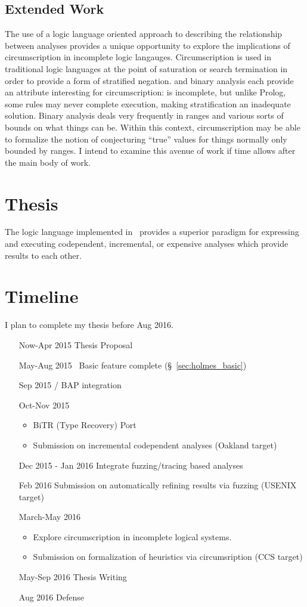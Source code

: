 \subsection{Extended Work}
The use of a logic language oriented approach to describing the relationship between analyses provides a unique opportunity to explore the implications of circumscription in incomplete logic langauges.
Circumscription is used in traditional logic languages at the point of saturation or search termination in order to provide a form of stratified negation.
\sysname and binary analysis each provide an attribute interesting for circumscription:
\sysname is incomplete, but unlike Prolog, some rules may never complete execution, making stratification an inadequate solution.
Binary analysis deals very frequently in ranges and various sorts of bounds on what things can be.
Within this context, circumscription may be able to formalize the notion of conjecturing ``true'' values for things normally only bounded by ranges.
I intend to examine this avenue of work if time allows after the main body of work.
\section{Thesis}
The logic language implemented in \sysname\ provides a superior paradigm for expressing and executing codependent, incremental, or expensive analyses which provide results to each other.
\section{Timeline}
I plan to complete my thesis before Aug 2016.
\begin{enumerate}
\item[Now-Apr 2015] Thesis Proposal
\item[May-Aug 2015] \sysname\ Basic feature complete (\S~\ref{sec:holmes_basic})
\item[Sep 2015] \sysname / BAP integration
\item[Oct-Nov 2015]
  \begin{itemize}
  \item BiTR (Type Recovery) Port
  \item Submission on incremental codependent analyses (Oakland target)
  \end{itemize}
\item[Dec 2015 - Jan 2016] Integrate fuzzing/tracing based analyses
\item[Feb 2016] Submission on automatically refining results via fuzzing (USENIX target)
\item[March-May 2016]
  \begin{itemize}
  \item Explore circumscription in incomplete logical systems.
  \item Submission on formalization of heuristics via circumsription (CCS target)
  \end{itemize}
\item[May-Sep 2016] Thesis Writing
\item[Aug 2016] Defense
\end{enumerate}
